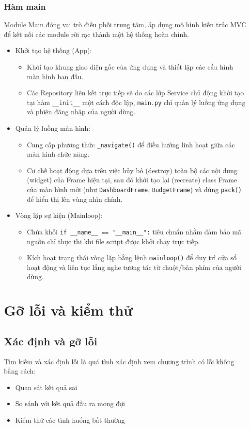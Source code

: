 \documentclass[12pt,letterpaper]{article}
\begin{document}
\subsubsection{Hàm main}
Module Main đóng vai trò điều phối trung tâm, áp dụng mô hình kiến trúc MVC để kết nối các module rời rạc thành một hệ thống hoàn chỉnh.
\begin{itemize}
    \item Khởi tạo hệ thống (App):
    \begin{itemize}
        \item Khởi tạo khung giao diện gốc của ứng dụng và thiết lập các cấu hình màn hình ban đầu.
        \item Các Repository liên kết trực tiếp sẽ do các lớp Service chủ động khởi tạo tại hàm \texttt{\_\_init\_\_} một cách độc lập, \texttt{main.py} chỉ quản lý luồng ứng dụng và phiên đăng nhập của người dùng.
    \end{itemize}
    \item Quản lý luồng màn hình:
    \begin{itemize}
        \item Cung cấp phương thức \texttt{\_navigate()} để điều hướng linh hoạt giữa các màn hình chức năng.
        \item Cơ chế hoạt động dựa trên việc hủy bỏ (destroy) toàn bộ các nội dung (widget) của Frame hiện tại, sau đó khởi tạo lại (recreate) class Frame của màn hình mới (như \texttt{DashboardFrame}, \texttt{BudgetFrame}) và dùng \texttt{pack()} để hiển thị lên vùng nhìn chính.
    \end{itemize}
    \item Vòng lặp sự kiện (Mainloop):
    \begin{itemize}
        \item Chứa khối \texttt{if \_\_name\_\_ == "\_\_main\_\_":} tiêu chuẩn nhằm đảm bảo mã nguồn chỉ thực thi khi file script được khởi chạy trực tiếp.
        \item Kích hoạt trạng thái vòng lặp bằng lệnh \texttt{mainloop()} để duy trì cửa sổ hoạt động và liên tục lắng nghe tương tác từ chuột/bàn phím của người dùng.
    \end{itemize}
\end{itemize}

\newpage
\section{Gỡ lỗi và kiểm thử}
\subsection{Xác định và gỡ lỗi}
Tìm kiếm và xác định lỗi là quá tình xác định xem chương trình có lỗi không bằng cách:
\begin{itemize}
    \item Quan sát kết quả sai
    \item So sánh với kết quả đầu ra mong đợi
    \item Kiểm thử các tình huống bất thường
\end{itemize}
\end{document}
